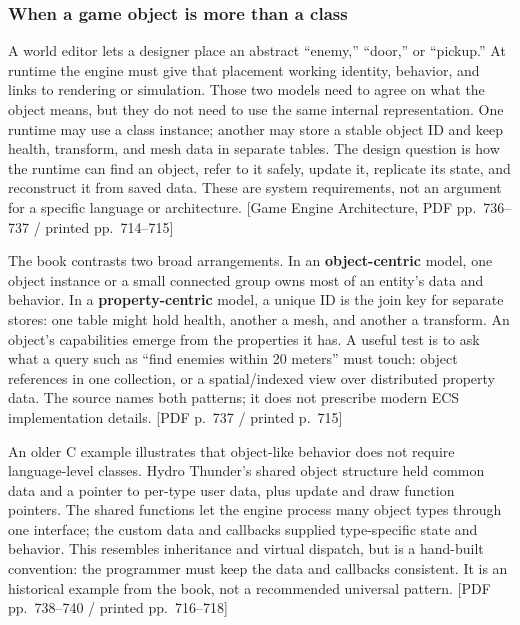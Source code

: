 \subsubsection{When a game object is more than a class}\label{06-engine-ii-ch032-when-a-game-object-is-more-than-a-class}

\hypertarget{06-engine-ii-ch032-when-a-game-object-is-more-than-a-class}{}

A world editor lets a designer place an abstract ``enemy,'' ``door,'' or ``pickup.'' At runtime the engine must give that placement working identity, behavior, and links to rendering or simulation. Those two models need to agree on what the object means, but they do not need to use the same internal representation. One runtime may use a class instance; another may store a stable object ID and keep health, transform, and mesh data in separate tables. The design question is how the runtime can find an object, refer to it safely, update it, replicate its state, and reconstruct it from saved data. These are system requirements, not an argument for a specific language or architecture. {[}Game Engine Architecture, PDF pp.~736--737 / printed pp.~714--715{]}

The book contrasts two broad arrangements. In an \textbf{object-centric} model, one object instance or a small connected group owns most of an entity's data and behavior. In a \textbf{property-centric} model, a unique ID is the join key for separate stores: one table might hold health, another a mesh, and another a transform. An object's capabilities emerge from the properties it has. A useful test is to ask what a query such as ``find enemies within 20 meters'' must touch: object references in one collection, or a spatial/indexed view over distributed property data. The source names both patterns; it does not prescribe modern ECS implementation details. {[}PDF p.~737 / printed p.~715{]}

An older C example illustrates that object-like behavior does not require language-level classes. Hydro Thunder's shared object structure held common data and a pointer to per-type user data, plus update and draw function pointers. The shared functions let the engine process many object types through one interface; the custom data and callbacks supplied type-specific state and behavior. This resembles inheritance and virtual dispatch, but is a hand-built convention: the programmer must keep the data and callbacks consistent. It is an historical example from the book, not a recommended universal pattern. {[}PDF pp.~738--740 / printed pp.~716--718{]}

